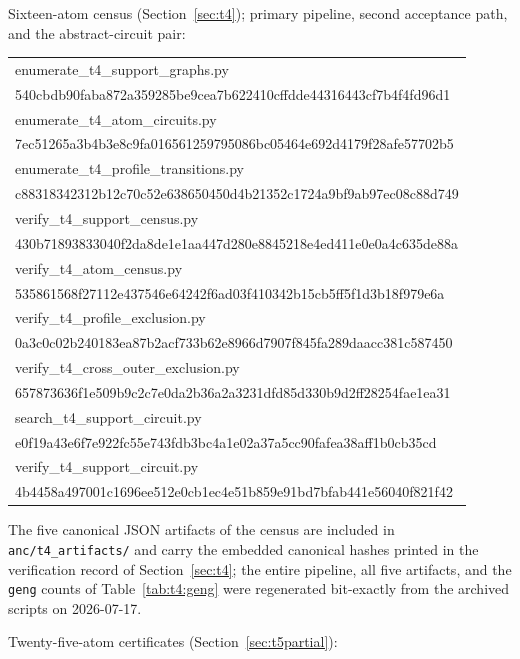 \documentclass[11pt]{article}
\theoremstyle{definition}
\begin{document}
\medskip
Sixteen-atom census (Section~\ref{sec:t4}); primary pipeline, second
acceptance path, and the abstract-circuit pair:

{\small\ttfamily\begin{tabular}{l}
enumerate\_t4\_support\_graphs.py\\
\quad 540cbdb90faba872a359285be9cea7b622410cffdde44316443cf7b4f4fd96d1\\
enumerate\_t4\_atom\_circuits.py\\
\quad 7ec51265a3b4b3e8c9fa016561259795086bc05464e692d4179f28afe57702b5\\
enumerate\_t4\_profile\_transitions.py\\
\quad c88318342312b12c70c52e638650450d4b21352c1724a9bf9ab97ec08c88d749\\
verify\_t4\_support\_census.py\\
\quad 430b71893833040f2da8de1e1aa447d280e8845218e4ed411e0e0a4c635de88a\\
verify\_t4\_atom\_census.py\\
\quad 535861568f27112e437546e64242f6ad03f410342b15cb5ff5f1d3b18f979e6a\\
verify\_t4\_profile\_exclusion.py\\
\quad 0a3c0c02b240183ea87b2acf733b62e8966d7907f845fa289daacc381c587450\\
verify\_t4\_cross\_outer\_exclusion.py\\
\quad 657873636f1e509b9c2c7e0da2b36a2a3231dfd85d330b9d2ff28254fae1ea31\\
search\_t4\_support\_circuit.py\\
\quad e0f19a43e6f7e922fc55e743fdb3bc4a1e02a37a5cc90fafea38aff1b0cb35cd\\
verify\_t4\_support\_circuit.py\\
\quad 4b4458a497001c1696ee512e0cb1ec4e51b859e91bd7bfab441e56040f821f42
\end{tabular}}

\medskip
The five canonical JSON artifacts of the census are included in
\texttt{anc/t4\_artifacts/} and carry the embedded
canonical hashes printed in the verification record of
Section~\ref{sec:t4}; the entire pipeline, all five artifacts, and the
\texttt{geng} counts of Table~\ref{tab:t4:geng} were regenerated
bit-exactly from the archived scripts on 2026-07-17.

\medskip
Twenty-five-atom certificates (Section~\ref{sec:t5partial}):
\end{document}
